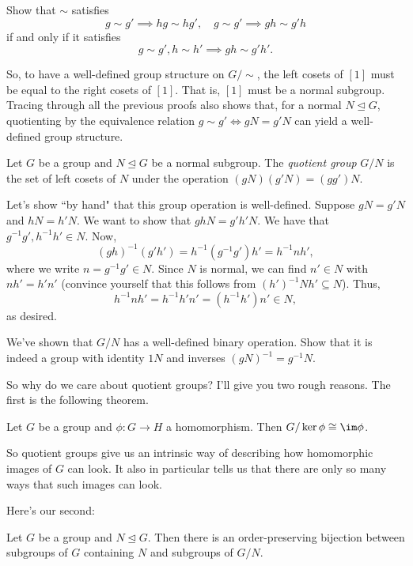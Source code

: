 \documentclass{article}
\begin{document}
\begin{exer} Show that $\sim$ satisfies
$$g\sim g'\implies hg\sim hg',\quad g\sim g'\implies gh\sim g'h$$
if and only if it satisfies
$$g\sim g',h\sim h'\implies gh\sim g'h'.$$
\end{exer}

So, to have a well-defined group structure on $G/\sim$, the left cosets of $[1]$ must be equal to the right cosets of $[1]$. That is, $[1]$ must be a normal subgroup. Tracing through all the previous proofs also shows that, for a normal $N\unlhd G$, quotienting by the equivalence relation $g\sim g'\iff gN=g'N$ can yield a well-defined group structure.

\begin{defn*} Let $G$ be a group and $N\unlhd G$ be a normal subgroup. The \textit{quotient group} $G/N$ is the set of left cosets of $N$ under the operation $(gN)(g'N)=(gg')N$.\end{defn*}

\begin{rem*} Let's show ``by hand" that this group operation is well-defined. Suppose $gN=g'N$ and $hN=h'N$. We want to show that $ghN=g'h'N$. We have that $g^{-1}g',h^{-1}h'\in N$. Now,
$$(gh)^{-1}(g'h')=h^{-1}(g^{-1}g')h'=h^{-1}nh',$$
where we write $n=g^{-1}g'\in N$. Since $N$ is normal, we can find $n'\in N$ with $nh'=h'n'$ (convince yourself that this follows from $(h')^{-1}Nh'\subseteq N$). Thus,
$$h^{-1}nh'=h^{-1}h'n'=(h^{-1}h')n'\in N,$$
as desired.
\end{rem*}

\begin{exer} We've shown that $G/N$ has a well-defined binary operation. Show that it is indeed a group with identity $1N$ and inverses $(gN)^{-1}=g^{-1}N$.\end{exer}

So why do we care about quotient groups? I'll give you two rough reasons. The first is the following theorem.

\begin{thm*} Let $G$ be a group and $\phi:G\to H$ a homomorphism. Then $G/\ker\phi\cong\im\phi$.\end{thm*}

So quotient groups give us an intrinsic way of describing how homomorphic images of $G$ can look. It also in particular tells us that there are only so many ways that such images can look.

Here's our second:

\begin{thm*} Let $G$ be a group and $N\unlhd G$. Then there is an order-preserving bijection between subgroups of $G$ containing $N$ and subgroups of $G/N$.\end{thm*}
\end{document}
